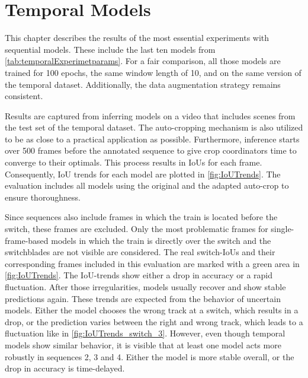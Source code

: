 \section{Temporal Models}
\label{sec:temporalModelsResults}

This chapter describes the results of the most essential experiments with sequential models.
These include the last ten models from \autoref{tab:temporalExperimetparams}.
For a fair comparison, all those models are trained for 100 epochs, the same window length of 10, and on the same version of the temporal dataset.
Additionally, the data augmentation strategy remains consistent.

Results are captured from inferring models on a video that includes scenes from the test set of the temporal dataset.
The auto-cropping mechanism is also utilized to be as close to a practical application as possible.
Furthermore, inference starts over 500 frames before the annotated sequence to give crop coordinators time to converge to their optimals.
This process results in \ac{IoU}s for each frame.
Consequently, \ac{IoU} trends for each model are plotted in \autoref{fig:IoUTrends}.
The evaluation includes all models using the original and the adapted auto-crop to ensure thoroughness.

Since sequences also include frames in which the train is located before the switch, these frames are excluded.
Only the most problematic frames for single-frame-based models in which the train is directly over the switch and the switchblades are not visible are considered.
The real switch-\ac{IoU}s and their corresponding frames included in this evaluation are marked with a green area in \autoref{fig:IoUTrends}.
The \ac{IoU}-trends show either a drop in accuracy or a rapid fluctuation.
After those irregularities, models usually recover and show stable predictions again.
These trends are expected from the behavior of uncertain models.
Either the model chooses the wrong track at a switch, which results in a drop, or the prediction varies between the right and wrong track, which leads to a fluctuation like in \autoref{fig:IoUTrends_switch_3}.
However, even though temporal models show similar behavior, it is visible that at least one model acts more robustly in sequences 2, 3 and 4.
Either the model is more stable overall, or the drop in accuracy is time-delayed.

